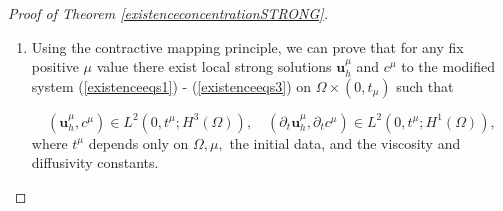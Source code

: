 \documentclass[11pt, a4paper]{article}
\newcommand*\diff{\mathop{}\!\mathrm{d}}
\begin{document}
\begin{proof}[Proof of Theorem \ref{existenceconcentrationSTRONG}]
\begin{enumerate}
On the other hand, we define a modified version of the convection-diffusion equation (\ref{HNSC5_strong_cshift}) by completing the missing term in the Laplacian adding the term $\mu \partial_{11} c$ with $\mu > 0$; specifically, the set of equations takes the form
%
\begin{equation} \label{existenceeqs1}
\begin{split}
\partial_t \mathbf{u}_h + \Delta_\nu \mathbf{u}_h + & (\mathbf{u}_h \cdot \nabla_h) \mathbf{u}_h - \bigg ( \int_{-a}^z \nabla_h \cdot \mathbf{u}_h (x, y, \xi, t) \diff \xi \bigg ) \partial_3 \mathbf{u}_h \\
& + f_0 k \times \mathbf{u}_h + \nabla_h p_s (x,y,t) = 0,
\end{split}
\end{equation}
%
\begin{equation} \label{existenceeqs2}
\nabla_h \cdot \bar{\mathbf{u}}_h = 0,
\end{equation}
%
\begin{equation} \label{existenceeqs3}
\begin{split}
\partial_t c+ \mathbf{u}_h \cdot \nabla_h c + \bigg ( - & \int_{-a}^z \nabla_h \cdot \mathbf{u}_h (x, y, \xi, t) \diff \xi \bigg ) \cdot \bigg (\partial_3 c - \frac{1}{a} \bigg ) \\
& - \Delta_{d} c - \mu \partial_{11} c = 0.
\end{split}
\end{equation}

Here $\bar{\mathbf{u}}_h$ is the vertically averaged version of the function, i.e. $$\frac{1}{2a} \int_{-a}^a \mathbf{u}_h (x,y,z) \diff z,$$ and $p_s$ is the classical notation for a pressure function depending on only the horizontal variables. Fore more details of this standard reformulation process see for example \cite{cao2014local} and \cite{cao2007global}.

\item Using the contractive mapping principle, we can prove that for any fix positive $\mu$ value there exist local strong solutions $\mathbf{u}_h^\mu$ and $c^\mu$ to the modified system (\ref{existenceeqs1}) - (\ref{existenceeqs3}) on $\Omega \times (0, t_\mu)$ such that

\[ (\mathbf{u}_h^\mu, c^\mu) \in L^2 (0, t^\mu; H^3(\Omega)), \quad (\partial_t \mathbf{u}_h^\mu, \partial_t c^\mu) \in L^2 (0, t^\mu; H^1 (\Omega)), \]
%
where $t^\mu$ depends only on $\Omega, \mu, $ the initial data, and the viscosity and diffusivity constants.


\end{enumerate}
\end{proof}
\end{document}
